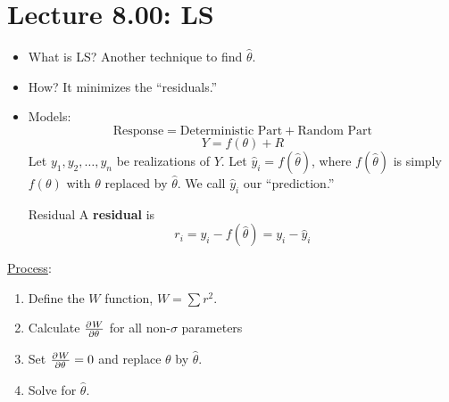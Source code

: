 \section{Lecture 8.00: LS}
\begin{itemize}
    \item What is LS\@? Another technique to find $ \hat{\theta} $.
    \item How? It minimizes the ``residuals.''
    \item Models:
          \[ \text{Response}=\text{Deterministic Part}+\text{Random Part} \]
          \[ Y=f(\theta)+R \]
          Let $ y_1,y_2,\ldots,y_n $ be realizations of $ Y $. Let
          $ \hat{y}_i=f(\hat{\theta}) $, where $ f(\hat{\theta}) $
          is simply $ f(\theta) $ with $ \theta $ replaced
          by $ \hat{\theta} $. We call $ \hat{y}_i $ our ``prediction.''
          \begin{Definition}{Residual}{}
              A \textbf{residual} is
              \[ r_i=y_i-f(\hat{\theta})=y_i-\hat{y}_i \]
          \end{Definition}
\end{itemize}
\underline{Process}:
\begin{enumerate}[(1)]
    \item Define the $ W $ function, $ W=\sum r^2 $.
    \item Calculate $ \pd{W}{\theta} $ for all non-$ \sigma $
          parameters
    \item Set $ \pd{W}{\theta}=0 $ and replace $ \theta $ by $ \hat{\theta} $.
    \item Solve for $ \hat{\theta} $.
\end{enumerate}

